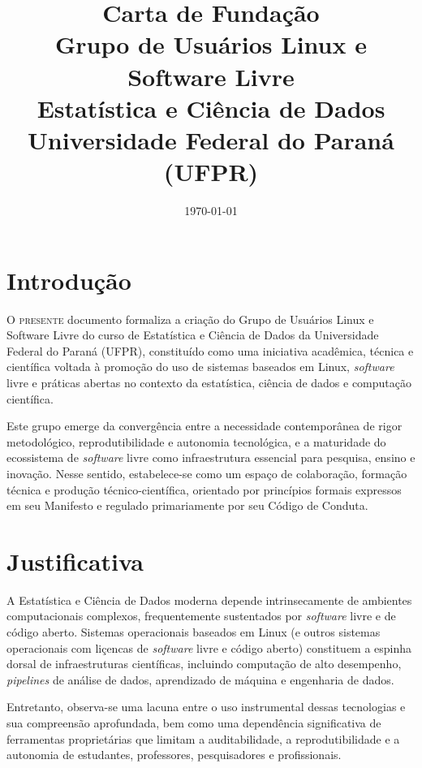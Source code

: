 \documentclass[
  12pt,          %
  a4paper,       %
  oneside,       %
  brazil         %
]{article}
\title{Carta de Fundação\\[0.3em]
  \Large\mdseries\color{gulecdGray}%
  Grupo de Usuários Linux e Software Livre\\Estatística e Ciência de Dados\\Universidade Federal do Paraná (UFPR)}
\date{\today}
\begin{document}
\thispagestyle{empty}
\maketitle

\newpage

\section{Introdução}

\lettrine[lines=3, lhang=0.1, nindent=0em, slope=-0.5em]{O}{ presente} documento formaliza a criação do Grupo de Usuários Linux e Software Livre do curso de  
Estatística e Ciência de Dados da Universidade Federal do Paraná (UFPR), constituído como uma iniciativa acadêmica, técnica e científica voltada à promoção do 
uso de sistemas baseados em Linux, \textit{software} livre e práticas abertas no contexto da estatística, ciência de dados e computação científica.

Este grupo emerge da convergência entre a necessidade contemporânea de rigor metodológico, reprodutibilidade e autonomia tecnológica, e a 
maturidade do ecossistema de \textit{software} livre como infraestrutura essencial para pesquisa, ensino e inovação. Nesse sentido, estabelece-se como um 
espaço de colaboração, formação técnica e produção técnico-científica, orientado por princípios formais expressos em seu Manifesto e regulado primariamente por seu Código de Conduta.

\section{Justificativa}

A Estatística e Ciência de Dados moderna depende intrinsecamente de ambientes computacionais complexos, frequentemente sustentados por \textit{software} livre e 
de código aberto. Sistemas operacionais baseados em Linux (e outros sistemas operacionais com liçencas de \textit{software} livre e código aberto) constituem a espinha dorsal de 
infraestruturas científicas, incluindo computação de alto desempenho, \textit{pipelines} de análise de dados, aprendizado de máquina e engenharia de dados.

Entretanto, observa-se uma lacuna entre o uso instrumental dessas tecnologias e sua compreensão aprofundada, 
bem como uma dependência significativa de ferramentas proprietárias que limitam a auditabilidade, a reprodutibilidade e a autonomia de estudantes, professores, 
pesquisadores e profissionais.
\end{document}
